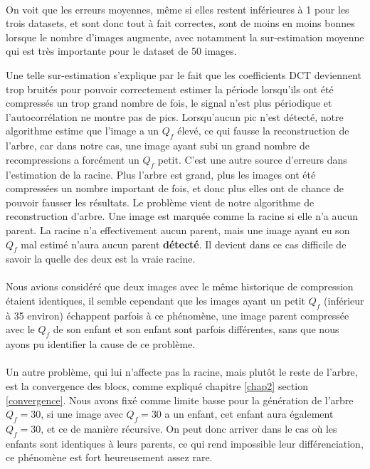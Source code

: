 \documentclass[utf8,final]{stageM2R} %
\begin{document}
\paragraph{}
On voit que les erreurs moyennes, même si elles restent inférieures à 1 pour les trois datasets, et sont donc tout à fait correctes, sont de moins en moins bonnes lorsque le nombre d'images augmente, avec notamment la sur-estimation moyenne qui est très importante pour le dataset de 50 images.

Une telle sur-estimation s'explique par le fait que les coefficients DCT deviennent trop bruités pour pouvoir correctement estimer la période lorsqu'ils ont été compressés un trop grand nombre de fois, le signal n'est plus périodique et l'autocorrélation ne montre pas de pics. Lorsqu'aucun pic n'est détecté, notre algorithme estime que l'image a un $Q_f$ élevé, ce qui fausse la reconstruction de l'arbre, car dans notre cas, une image ayant subi un grand nombre de recompressions a forcément un $Q_f$ petit. C'est une autre source d'erreurs dans l'estimation de la racine. Plus l'arbre est grand, plus les images ont été compressées un nombre important de fois, et donc plus elles ont de chance de pouvoir fausser les résultats. Le problème vient de notre algorithme de reconstruction d'arbre. Une image est marquée comme la racine si elle n'a aucun parent. La racine n'a effectivement aucun parent, mais une image ayant eu son $Q_f$ mal estimé n'aura aucun parent \textbf{détecté}. Il devient dans ce cas difficile de savoir la quelle des deux est la vraie racine.
\paragraph{}

Nous avions considéré que deux images avec le même historique de compression étaient identiques, il semble cependant que les images ayant un petit $Q_f$ (inférieur à 35 environ) échappent parfois à ce phénomène, une image parent compressée avec le $Q_f$ de son enfant et son enfant sont parfois différentes, sans que nous ayons pu identifier la cause de ce problème.
\paragraph{}

Un autre problème, qui lui n'affecte pas la racine, mais plutôt le reste de l'arbre, est la convergence des blocs, comme expliqué chapitre \ref{chap2} section \ref{convergence}. Nous avons fixé comme limite basse pour la génération de l'arbre $Q_f = 30$, si une image avec $Q_f = 30$ a un enfant, cet enfant aura également $Q_f = 30$, et ce de manière récursive. On peut donc arriver dans le cas où les enfants sont identiques à leurs parents, ce qui rend impossible leur différenciation, ce phénomène est fort heureusement assez rare.
\end{document}
